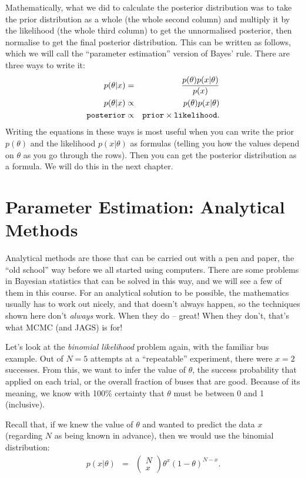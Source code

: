 Mathematically, what we did to calculate the posterior distribution was to
take the prior distribution as a whole (the whole second column) and multiply it
by the likelihood (the whole third column) to get the
unnormalised posterior, then normalise to get the final posterior distribution.
This can be written as follows, which we will call the ``parameter estimation''
version of Bayes' rule. There are three ways to write it:
\begin{eqnarray}
p(\theta | x) &=& \frac{p(\theta)p(x|\theta)}{p(x)}\\
p(\theta | x) &\propto& p(\theta)p(x|\theta)\\
{\tt posterior} &\propto& {\tt prior}\times{\tt likelihood}.
\end{eqnarray}
Writing the equations in these ways is most useful when you can write the
prior $p(\theta)$ and the likelihood $p(x|\theta)$ as formulas (telling you
how the values depend on $\theta$ as you go through the rows). Then you can get the
posterior distribution as a formula. We will do this in the next chapter.

\chapter{Parameter Estimation: Analytical Methods}
Analytical methods are those that can be carried out with a pen and paper,
the ``old school'' way before we all started using computers. There are some
problems in Bayesian statistics that can be solved in this way, and we will
see a few of them in this course. For an analytical solution to be possible, the
mathematics usually has to work out nicely, and that doesn't always happen, so
the techniques shown here don't {\it always} work. When they do -- great! When
they don't, that's what MCMC (and JAGS) is for!

Let's look at the {\it binomial likelihood} problem again, with the familiar
bus example. Out of $N=5$ attempts at a ``repeatable'' experiment, there were
$x=2$ successes. From this, we want to infer the value of $\theta$, the
success probability that applied on each trial, or the overall fraction of 
buses that are good. Because of its meaning, we know
with 100\% certainty that $\theta$ must be between 0 and 1 (inclusive).

Recall that, if we knew the
value of $\theta$ and wanted to predict the data $x$ (regarding $N$ as being
known in advance), then we would use the binomial distribution:
\begin{eqnarray}
p(x|\theta) &=& \left(\begin{array}{c}N \\ x\end{array}\right)
\theta^x\left(1-\theta\right)^{N - x}.\label{eq:binomial_likelihood}
\end{eqnarray}

